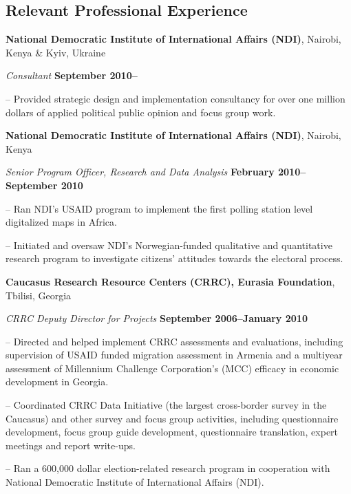 \documentclass[margin,line]{res}
\newenvironment{list1}{
  \begin{list}{\ding{113}}{%
      \setlength{\itemsep}{0in}
      \setlength{\parsep}{0in} \setlength{\parskip}{0in}
      \setlength{\topsep}{0in} \setlength{\partopsep}{0in} 
      \setlength{\leftmargin}{0.17in}}}{\end{list}}
\begin{document}
{\begin{resume}
\section{\sc Relevant Professional Experience}
{\bf National Democratic Institute of International Affairs (NDI)},
Nairobi, Kenya \& Kyiv, Ukraine

\vspace{-.3cm}
{\em Consultant} \hfill {\bf
  September 2010--}\\
\begin{list1}
\item[]-- Provided strategic design and implementation consultancy
  for over one million dollars of applied
political public opinion and focus group work.
\end{list1}

{\bf National Democratic Institute of International Affairs (NDI)}, Nairobi, Kenya
\vspace{-.3cm}

{\em Senior Program Officer, Research and Data Analysis} \hfill {\bf
  February 2010--September 2010}\\
\vspace{-.3cm}
\begin{list1} 
\item[]-- Ran NDI's  USAID program to implement the first polling station level
digitalized maps in Africa.
\item[]-- Initiated and oversaw NDI's
Norwegian-funded qualitative and quantitative research program to
investigate citizens' attitudes towards the electoral process.
\end{list1}
{\bf Caucasus Research Resource Centers (CRRC), Eurasia Foundation},
Tbilisi, Georgia

\vspace{-.3cm}
{\em CRRC Deputy Director for Projects} \hfill {\bf
  September 2006--January 2010}\\

\vspace{-.3cm}
\begin{list1} 
\item[]-- Directed and helped implement CRRC assessments and evaluations,
  including supervision of USAID funded migration assessment in
  Armenia and a multiyear assessment of Millennium Challenge
  Corporation's (MCC) efficacy in economic development in
  Georgia. 
\item[]-- Coordinated CRRC Data Initiative (the largest cross-border
  survey in the Caucasus) and other survey and focus group activities,
  including questionnaire development, focus group guide development,
  questionnaire translation, expert meetings and report write-ups. 
\item[]-- Ran a 600,000 dollar election-related research program in
  cooperation with National Democratic Institute of International
  Affairs (NDI).
\end{list1}




\end{resume}}
\end{document}
